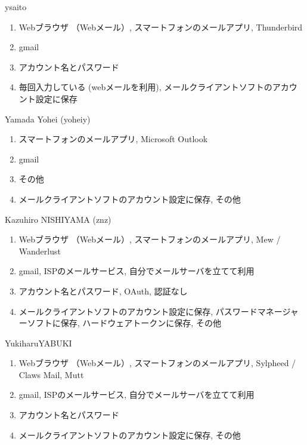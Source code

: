 \begin{prework}{ ysaito }
  \begin{enumerate}
  \item Webブラウザ （Webメール）, スマートフォンのメールアプリ, Thunderbird
  \item gmail
  \item アカウント名とパスワード
  \item 毎回入力している (webメールを利用), メールクライアントソフトのアカウント設定に保存
  \end{enumerate}
\end{prework}

\begin{prework}{ Yamada Yohei (yoheiy) }
  \begin{enumerate}
  \item スマートフォンのメールアプリ, Microsoft Outlook
  \item gmail
  \item その他
  \item メールクライアントソフトのアカウント設定に保存, その他
  \end{enumerate}
\end{prework}

\begin{prework}{ Kazuhiro NISHIYAMA (znz) }
  \begin{enumerate}
  \item Webブラウザ （Webメール）, スマートフォンのメールアプリ, Mew / Wanderlust
  \item gmail, ISPのメールサービス, 自分でメールサーバを立てて利用
  \item アカウント名とパスワード, OAuth, 認証なし
  \item メールクライアントソフトのアカウント設定に保存, パスワードマネージャーソフトに保存, ハードウェアトークンに保存, その他
  \end{enumerate}
\end{prework}

\begin{prework}{ YukiharuYABUKI }
  \begin{enumerate}
  \item Webブラウザ （Webメール）, スマートフォンのメールアプリ, Sylpheed / Claws Mail, Mutt
  \item gmail, ISPのメールサービス, 自分でメールサーバを立てて利用
  \item アカウント名とパスワード
  \item メールクライアントソフトのアカウント設定に保存, その他
  \end{enumerate}
\end{prework}

